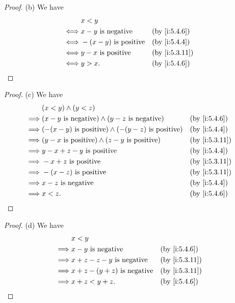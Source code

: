 \begin{proof}{(b)}
  We have
  \begin{align*}
         & x < y                                           \\
    \iff & x - y \text{ is negative}    &  & \by{i:5.4.6}  \\
    \iff & -(x - y) \text{ is positive} &  & \by{i:5.4.4}  \\
    \iff & y - x \text{ is positive}    &  & \by{i:5.3.11} \\
    \iff & y > x.                       &  & \by{i:5.4.6}
  \end{align*}
\end{proof}

\begin{proof}{(c)}
  We have
  \begin{align*}
             & (x < y) \land (y < z)                                                                  \\
    \implies & (x - y \text{ is negative}) \land (y - z \text{ is negative})       &  & \by{i:5.4.6}  \\
    \implies & (-(x - y) \text{ is positive}) \land (-(y - z) \text{ is positive}) &  & \by{i:5.4.4}  \\
    \implies & (y - x \text{ is positive}) \land (z - y \text{ is positive})       &  & \by{i:5.3.11} \\
    \implies & y - x + z - y \text{ is positive}                                   &  & \by{i:5.4.4}  \\
    \implies & - x + z \text{ is positive}                                         &  & \by{i:5.3.11} \\
    \implies & -(x - z) \text{ is positive}                                        &  & \by{i:5.3.11} \\
    \implies & x - z \text{ is negative}                                           &  & \by{i:5.4.4}  \\
    \implies & x < z.                                                              &  & \by{i:5.4.6}
  \end{align*}
\end{proof}

\begin{proof}{(d)}
  We have
  \begin{align*}
             & x < y                                                  \\
    \implies & x - y \text{ is negative}           &  & \by{i:5.4.6}  \\
    \implies & x + z - z - y \text{ is negative}   &  & \by{i:5.3.11} \\
    \implies & x + z - (y + z) \text{ is negative} &  & \by{i:5.3.11} \\
    \implies & x + z < y + z.                      &  & \by{i:5.4.6}
  \end{align*}
\end{proof}


